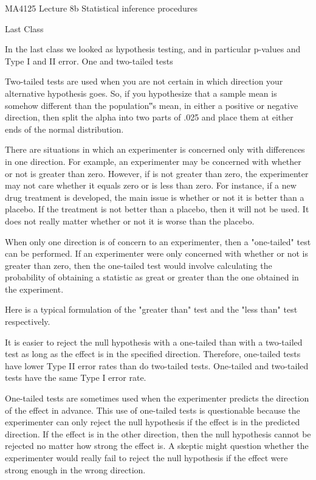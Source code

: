  
MA4125 Lecture 8b Statistical inference procedures

Last Class
 
In the last class we looked as hypothesis testing, and in particular p-values and Type I and II error.
One and two-tailed tests


Two-tailed tests are used when you are not certain in which direction your alternative hypothesis goes. So, if you hypothesize that a sample mean is somehow different than the population‟s mean, in either a positive or negative direction, then split the alpha into two parts of .025 and place them at either ends of the normal distribution.
 


 
There are situations in which an experimenter is concerned only with differences in one direction. For example, an experimenter may be concerned with whether or not  is greater than zero. However, if  is not greater than zero, the experimenter may not care whether it equals zero or is less than zero. For instance, if a new drug treatment is developed, the main issue is whether or not it is better than a placebo. If the treatment is not better than a placebo, then it will not be used. It does not really matter whether or not it is worse than the placebo.
 
When only one direction is of concern to an experimenter, then a "one-tailed" test can be performed. If an experimenter were only concerned with whether or not   is greater than zero, then the one-tailed test would involve calculating the probability of obtaining a statistic as great or greater than the one obtained in the experiment.
 
Here is a typical formulation of the "greater than" test and the "less than" test respectively.
 
         
 
It is easier to reject the null hypothesis with a one-tailed than with a two-tailed test as long as the effect is in the specified direction. Therefore, one-tailed tests have lower Type II error rates than do two-tailed tests.  One-tailed and two-tailed tests have the same Type I error rate. 
 
One-tailed tests are sometimes used when the experimenter predicts the direction of the effect in advance. This use of one-tailed tests is questionable because the experimenter can only reject the null hypothesis if the effect is in the predicted direction. If the effect is in the other direction, then the null hypothesis cannot be rejected no matter how strong the effect is. A skeptic might question whether the experimenter would really fail to reject the null hypothesis if the effect were strong enough in the wrong direction. 
 

